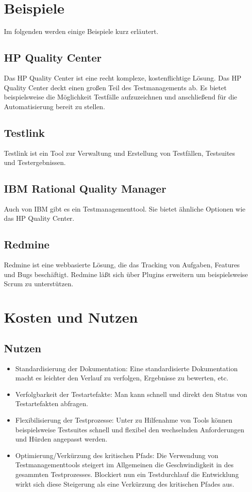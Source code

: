 \section{Beispiele}
Im folgenden werden einige Beispiele kurz erl\"autert.

\subsection{HP Quality Center}
Das HP Quality Center ist eine recht komplexe, kostenflichtige L\"osung. Das HP Quality Center deckt einen gro\ss{}en Teil des Testmanagements ab. Es bietet beispielsweise die M\"oglichkeit Testf\"alle aufzuzeichnen und anschlie\ss{}end f\"ur die Automatisierung bereit zu stellen.

\subsection{Testlink}
Testlink ist ein Tool zur Verwaltung und Erstellung von Testf\"allen, Testsuites und Testergebnissen. 

\subsection{IBM Rational Quality Manager}
Auch von IBM gibt es ein Testmanagementtool. Sie bietet \"ahnliche Optionen wie das HP Quality Center.

\subsection{Redmine}
Redmine ist eine webbasierte L\"osung, die das Tracking von Aufgaben, Features und Bugs besch\"aftigt. Redmine l\"a\ss{}t sich \"uber Plugins erweitern um beispielsweise Scrum zu unterst\"utzen.

\section{Kosten und Nutzen}
\subsection{Nutzen}
\begin{itemize}
	\item Standardisierung der Dokumentation: Eine standardisierte Dokumentation macht es leichter den Verlauf zu verfolgen, Ergebnisse zu bewerten, etc.
	\item Verfolgbarkeit der Testartefakte: Man kann schnell und direkt den Status von Testartefakten abfragen.
	\item Flexibilisierung der Testprozesse: Unter zu Hilfenahme von Tools k\"onnen beispielsweise Testsuites schnell und flexibel den wechselnden Anforderungen und H\"urden angepasst werden.
	\item Optimierung/Verk\"urzung des kritischen Pfads: Die Verwendung von Testmanagementtools steigert im Allgemeinen die Geschwindigkeit in des gesammten Testprozesses. Blockiert nun ein Testdurchlauf die Entwicklung wirkt sich diese Steigerung als eine Verk\"urzung des kritischen Pfades aus.
\end{itemize}
